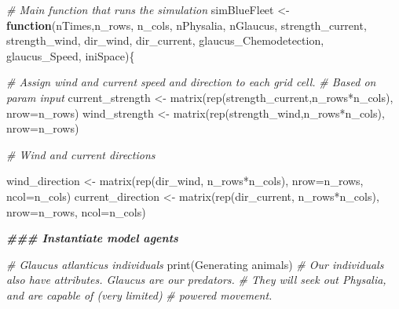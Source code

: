 \documentclass[
]{article}
\newenvironment{Shaded}{\begin{snugshade}}{\end{snugshade}}
\newcommand{\AttributeTok}[1]{\textcolor[rgb]{0.77,0.63,0.00}{#1}}
\newcommand{\CommentTok}[1]{\textcolor[rgb]{0.56,0.35,0.01}{\textit{#1}}}
\newcommand{\ControlFlowTok}[1]{\textcolor[rgb]{0.13,0.29,0.53}{\textbf{#1}}}
\newcommand{\DocumentationTok}[1]{\textcolor[rgb]{0.56,0.35,0.01}{\textbf{\textit{#1}}}}
\newcommand{\FunctionTok}[1]{\textcolor[rgb]{0.00,0.00,0.00}{#1}}
\newcommand{\NormalTok}[1]{#1}
\newcommand{\OtherTok}[1]{\textcolor[rgb]{0.56,0.35,0.01}{#1}}
\newcommand{\SpecialCharTok}[1]{\textcolor[rgb]{0.00,0.00,0.00}{#1}}
\newcommand{\StringTok}[1]{\textcolor[rgb]{0.31,0.60,0.02}{#1}}
\begin{document}
\begin{Shaded}
\begin{Highlighting}[]
\CommentTok{\# Main function that runs the simulation}
\NormalTok{simBlueFleet }\OtherTok{\textless{}{-}} \ControlFlowTok{function}\NormalTok{(nTimes,n\_rows, n\_cols, nPhysalia, nGlaucus,}
\NormalTok{                         strength\_current, strength\_wind,}
\NormalTok{                         dir\_wind, dir\_current,}
\NormalTok{                         glaucus\_Chemodetection, glaucus\_Speed, iniSpace)\{}
  
  \CommentTok{\# Assign wind and current speed and direction to each grid cell.}
  \CommentTok{\# Based on param input}
\NormalTok{  current\_strength }\OtherTok{\textless{}{-}} \FunctionTok{matrix}\NormalTok{(}\FunctionTok{rep}\NormalTok{(strength\_current,n\_rows}\SpecialCharTok{*}\NormalTok{n\_cols), }
                              \AttributeTok{nrow=}\NormalTok{n\_rows)}
\NormalTok{  wind\_strength }\OtherTok{\textless{}{-}} \FunctionTok{matrix}\NormalTok{(}\FunctionTok{rep}\NormalTok{(strength\_wind,n\_rows}\SpecialCharTok{*}\NormalTok{n\_cols), }
                           \AttributeTok{nrow=}\NormalTok{n\_rows)}
  
  \CommentTok{\# Wind and current directions}
  
\NormalTok{  wind\_direction }\OtherTok{\textless{}{-}} \FunctionTok{matrix}\NormalTok{(}\FunctionTok{rep}\NormalTok{(dir\_wind, n\_rows}\SpecialCharTok{*}\NormalTok{n\_cols), }
                            \AttributeTok{nrow=}\NormalTok{n\_rows, }\AttributeTok{ncol=}\NormalTok{n\_cols)}
\NormalTok{  current\_direction }\OtherTok{\textless{}{-}} \FunctionTok{matrix}\NormalTok{(}\FunctionTok{rep}\NormalTok{(dir\_current, n\_rows}\SpecialCharTok{*}\NormalTok{n\_cols), }
                               \AttributeTok{nrow=}\NormalTok{n\_rows, }\AttributeTok{ncol=}\NormalTok{n\_cols)}
  
  
  \DocumentationTok{\#\#\# Instantiate model agents}
  
  \CommentTok{\# Glaucus atlanticus individuals}
  \FunctionTok{print}\NormalTok{(}\StringTok{\textquotesingle{}Generating animals\textquotesingle{}}\NormalTok{)}
  \CommentTok{\# Our individuals also have attributes. Glaucus are our predators.}
  \CommentTok{\# They will seek out Physalia, and are capable of (very limited)}
  \CommentTok{\# powered movement. }
  

\end{Highlighting}
\end{Shaded}
\end{document}
